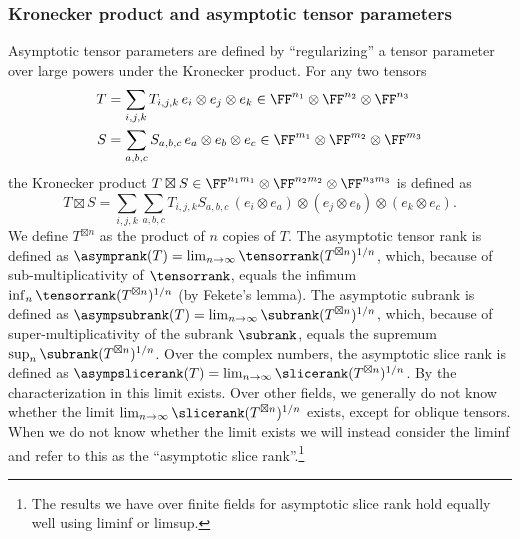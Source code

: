 \subsubsection*{Kronecker product and asymptotic tensor parameters}
%
Asymptotic tensor parameters are defined by ``regularizing'' a tensor parameter over large powers under the Kronecker product. For any two tensors 
\begin{align*}
T &= \sum_{i,j,k} T_{i,j,k}\, e_i \otimes e_j \otimes e_k \in \FF^{n_1} \otimes \FF^{n_2} \otimes \FF^{n_3}\\
S &= \sum_{a,b,c} S_{a,b,c} \, e_a\otimes e_b \otimes e_c \in \FF^{m_1} \otimes \FF^{m_2} \otimes \FF^{m_3}
\end{align*}
the Kronecker product $T \boxtimes S \in \FF^{n_1 m_1} \otimes \FF^{n_2 m_2} \otimes \FF^{n_3 m_3}$ is defined as
\[
T \boxtimes S = \sum_{i,j,k} \sum_{a,b,c} T_{i,j,k} S_{a,b,c}\, (e_i \otimes e_{a}) \otimes (e_j \otimes e_{b}) \otimes (e_k \otimes e_{c}).
\]
We define $T^{\boxtimes n}$ as the product of $n$ copies of $T$. The asymptotic tensor rank is defined as $\asymprank(T) = \lim_{n \to \infty} \tensorrank(T^{\boxtimes n})^{1/n}$, which, because of sub-multiplicativity of $\tensorrank$, equals the infimum $\inf_{n} \tensorrank(T^{\boxtimes n})^{1/n}$ (by Fekete's lemma). The asymptotic subrank is defined as $\asympsubrank(T) = \lim_{n \to \infty} \subrank(T^{\boxtimes n})^{1/n}$, which, because of super-multiplicativity of the subrank $\subrank$, equals the supremum $\sup_{n} \subrank(T^{\boxtimes n})^{1/n}$. Over the complex numbers, the asymptotic slice rank is defined as $\asympslicerank(T) = \lim_{n\to\infty} \slicerank(T^{\boxtimes n})^{1/n}$. By the characterization in \cite{MR4495838} this limit exists. Over other fields, we generally do not know whether the limit $\lim_{n\to\infty} \slicerank(T^{\boxtimes n})^{1/n}$ exists, except for oblique tensors. When we do not know whether the limit exists we will instead consider the liminf and refer to this as the ``asymptotic slice rank''.\footnote{The results we have over finite fields for asymptotic slice rank hold equally well using liminf or limsup.}

